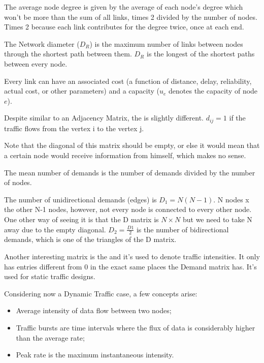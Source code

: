 The average node degree is given by the average of each node's degree which won't be more than the sum of all links, times 2 divided by the number of nodes. Times 2 because each link contributes for the degree twice, once at each end.



The Network diameter ($D_R$) is the maximum number of links between nodes through the shortest path between them. $D_R$ is the longest of the shortest paths between every node.


Every link can have an associated cost (a function of distance, delay, reliability, actual cost, or other parameters) and a capacity ($u_e$ denotes the capacity of node $e$).



Despite similar to an Adjacency Matrix, the  is slightly different. $d_{ij} = 1$ if the traffic flows from the vertex i to the vertex j.

Note that the diagonal of this matrix should be empty, or else it would mean that a certain node would receive information from himself, which makes no sense.

The mean number of demands is the number of demands divided by the number of nodes.


The number of unidirectional demands (edges) is $D_1  = N (N-1)$. N nodes x the other N-1 nodes, however, not every node is connected to every other node.
One other way of seeing it is that the D matrix is $N \times N$ but we need to take N away due to the empty diagonal. $D_2 = \frac{D1}{2}$ is the number of bidirectional demands, which is one of the triangles of the D matrix. 



Another interesting matrix is the  and it's used to denote traffic intensities. It only has entries different from 0 in the exact same places the Demand matrix has. It's used for static traffic designs.



Considering now a Dynamic Traffic case, a few concepts arise:
\begin{itemize}
    \item Average intensity of data flow between two nodes;
    \item Traffic bursts are time intervals where the flux of data is considerably higher than the average rate;
    \item Peak rate is the maximum instantaneous intensity.
\end{itemize}

